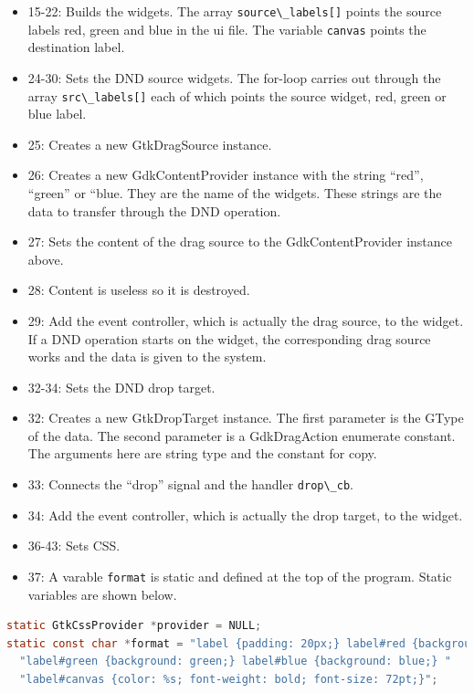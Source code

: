 \begin{itemize}
\tightlist
\item
  15-22: Builds the widgets. The array
  \passthrough{\lstinline!source\_labels[]!} points the source labels
  red, green and blue in the ui file. The variable
  \passthrough{\lstinline!canvas!} points the destination label.
\item
  24-30: Sets the DND source widgets. The for-loop carries out through
  the array \passthrough{\lstinline!src\_labels[]!} each of which points
  the source widget, red, green or blue label.
\item
  25: Creates a new GtkDragSource instance.
\item
  26: Creates a new GdkContentProvider instance with the string ``red'',
  ``green'' or ``blue. They are the name of the widgets. These strings
  are the data to transfer through the DND operation.
\item
  27: Sets the content of the drag source to the GdkContentProvider
  instance above.
\item
  28: Content is useless so it is destroyed.
\item
  29: Add the event controller, which is actually the drag source, to
  the widget. If a DND operation starts on the widget, the corresponding
  drag source works and the data is given to the system.
\item
  32-34: Sets the DND drop target.
\item
  32: Creates a new GtkDropTarget instance. The first parameter is the
  GType of the data. The second parameter is a GdkDragAction enumerate
  constant. The arguments here are string type and the constant for
  copy.
\item
  33: Connects the ``drop'' signal and the handler
  \passthrough{\lstinline!drop\_cb!}.
\item
  34: Add the event controller, which is actually the drop target, to
  the widget.
\item
  36-43: Sets CSS.
\item
  37: A varable \passthrough{\lstinline!format!} is static and defined
  at the top of the program. Static variables are shown below.
\end{itemize}

\begin{lstlisting}[language=C]
static GtkCssProvider *provider = NULL;
static const char *format = "label {padding: 20px;} label#red {background: red;} "
  "label#green {background: green;} label#blue {background: blue;} "
  "label#canvas {color: %s; font-weight: bold; font-size: 72pt;}";
\end{lstlisting}

